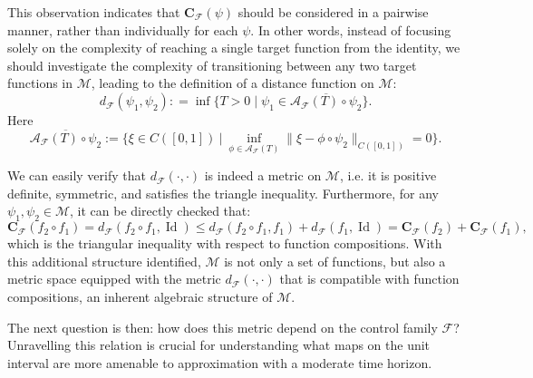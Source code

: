 \documentclass[12pt]{amsart}
\numberwithin{equation}{section}
\theoremstyle{remark}
\begin{document}
This observation indicates that $\mathbf C_{\mathcal F}(\psi)$ should be considered in a pairwise manner, rather than individually for each $\psi$. In other words, instead of focusing solely on the complexity of reaching a single target function from the identity, we should investigate the complexity of transitioning between any two target functions in $\mathcal M$, leading to the definition of a distance function on $\mathcal M$:
\begin{equation}
        \label{eq:distance}
        d_{\mathcal F}(\psi_1, \psi_2): = \inf\{T>0\mid \psi_1\in \overline{\mathcal A_{\mathcal F}(T)\circ \psi_2}\}.
    \end{equation}
Here $$\overline{\mathcal A_{\mathcal F}(T) \circ \psi_2} := \{ \xi \in C([0,1]) ~|~ \inf_{\phi \in \mathcal A_{\mathcal F}(T)} \| \xi - \phi\circ \psi_2 \|_{C([0,1])} = 0\}.$$

We can easily verify that $d_{\mathcal F}(\cdot, \cdot)$ is indeed a metric on $\mathcal M$, i.e. it is positive definite, symmetric, and satisfies the triangle inequality. Furthermore, for any $\psi_1, \psi_2\in \mathcal M$, it can be directly checked that:
\begin{equation}
    \mathbf{C}_{\mathcal F}(f_2\circ f_1)= d_{\mathcal F}(f_2\circ f_1, \operatorname{Id})
    \le d_{\mathcal F}(f_2\circ f_1, f_1)+d_{\mathcal F}(f_1, \operatorname{Id})=\mathbf{C}_{\mathcal F}(f_2)+\mathbf{C}_{\mathcal F}(f_1),
\end{equation}
which is the triangular inequality with respect to function compositions.
With this additional structure identified,
$\mathcal M$ is not only a set of functions, but also a metric space equipped with the metric $d_{\mathcal F}(\cdot, \cdot)$ that is compatible with function compositions, an inherent algebraic structure of $\mathcal M$.

The next question is then: how does this metric depend on the control family $\mathcal F$?
Unravelling this relation is crucial for understanding
what maps on the unit interval are more amenable to approximation with a moderate time horizon.
\end{document}
